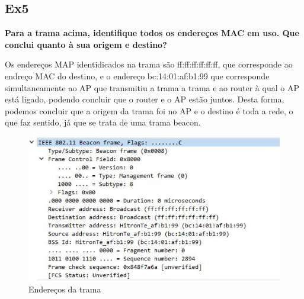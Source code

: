 \documentclass{article}
\begin{document}
\subsection{Ex5}
\textbf{Para a trama acima, identifique todos os endereços MAC em uso. Que conclui quanto à sua origem e destino?}\\\par
Os endereços MAP identidicados na trama são ff:ff:ff:ff:ff:ff, que corresponde ao endreço MAC do destino, e o endereço bc:14:01:af:b1:99 que corresponde simultaneamente ao AP que transmitiu a trama a trama e ao router à qual o AP está ligado, podendo concluir que o router e o AP estão juntos. Desta forma, podemos concluir que a origem da trama foi no AP e o destino é toda a rede, o que faz sentido, já que se trata de uma trama beacon.
\begin{figure}[h]
	\centering
	\includegraphics[scale = 0.7]{ex-5.JPG}
	\caption{Endereços da trama}
\end{figure}
\end{document}
